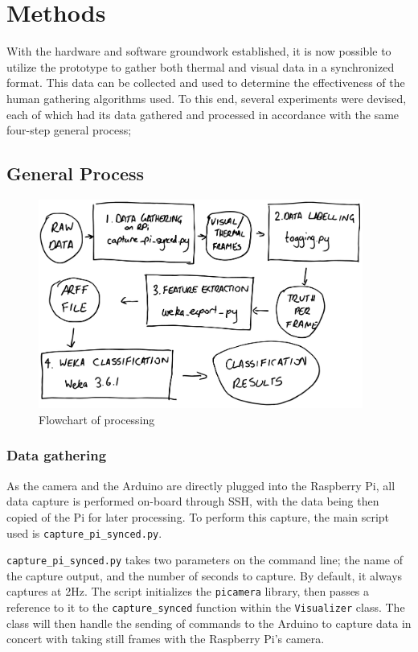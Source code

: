 \documentclass[../thesis/thesis.tex]{subfiles}
\begin{document}
 \chapter{Methods}
With the hardware and software groundwork established, it is now possible to utilize the prototype to gather both thermal and visual data in a synchronized format. This data can be collected and used to determine the effectiveness of the human gathering algorithms used. To this end, several experiments were devised, each of which had its data gathered and processed in accordance with the same four-step general process;

\section{General Process}

\begin{figure}
\centering
\includegraphics[width=0.95\textwidth]{../diagrams/temp/method-flowchart.pdf}
\caption{Flowchart of processing}
\label{fig:methods:flowchart}
\end{figure}

\subsection{Data gathering}
As the camera and the Arduino are directly plugged into the Raspberry Pi, all data capture is performed on-board through SSH, with the data being then copied of the Pi for later processing. To perform this capture, the main script used is \texttt{capture\_pi\_synced.py}.

\texttt{capture\_pi\_synced.py} takes two parameters on the command line; the name of the capture output, and the number of seconds to capture. By default, it always captures at 2Hz. The script initializes the \texttt{picamera} library, then passes a reference to it to the \texttt{capture\_synced} function within the \texttt{Visualizer} class. The class will then handle the sending of commands to the Arduino to capture data in concert with taking still frames with the Raspberry Pi's camera.
\end{document}
